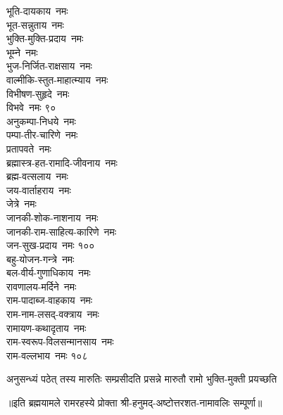 \begin{multicols}{2}
\begin{flushleft}
भूति-दायकाय~नमः\\
भूत-सन्नुताय~नमः\\
भुक्ति-मुक्ति-प्रदाय~नमः\\
भूम्ने~नमः\\
भुज-निर्जित-राक्षसाय~नमः\\
वाल्मीकि-स्तुत-माहात्म्याय~नमः\\
विभीषण-सुहृदे~नमः \\
विभवे~नमः  \hfill ९०\\
अनुकम्पा-निधये~नमः\\
पम्पा-तीर-चारिणे~नमः\\
प्रतापवते~नमः\\
ब्रह्मास्त्र-हत-रामादि-जीवनाय~नमः \\
ब्रह्म-वत्सलाय~नमः \\
जय-वार्ताहराय~नमः\\
जेत्रे~नमः \\
जानकी-शोक-नाशनाय~नमः\\
जानकी-राम-साहित्य-कारिणे~नमः\\
जन-सुख-प्रदाय~नमः \hfill १००\\
बहु-योजन-गन्त्रे~नमः\\
बल-वीर्य-गुणाधिकाय~नमः \\
रावणालय-मर्दिने~नमः\\
राम-पादाब्ज-वाहकाय~नमः  \\
राम-नाम-लसद्-वक्त्राय~नमः \\
रामायण-कथादृताय~नमः\\
राम-स्वरूप-विलसन्मानसाय~नमः\\
राम-वल्लभाय~नमः \hfill १०८
\end{flushleft}
\end{multicols}
{अनुसन्ध्यं पठेत् तस्य मारुतिः सम्प्रसीदति}
{प्रसन्ने मारुतौ रामो भुक्ति-मुक्ती प्रयच्छति} 


॥इति ब्रह्मयामले रामरहस्ये प्रोक्ता श्री-हनुमद्-अष्टोत्तरशत-नामावलिः सम्पूर्णा॥

